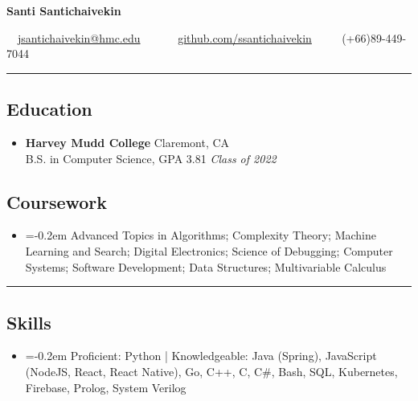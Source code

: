 \documentclass[10pt,letterpaper]{article}
\begin{document}
\fontsize{9.0}{11.0}\selectfont

\begin{center}
{\Large \textbf{Santi Santichaivekin}}

\ \ \href{mailto:jsantichaivekin@hmc.edu}{jsantichaivekin@hmc.edu}\ \ 
\ \ \textbullet
\ \ \href{https://github.com/ssantichaivekin}{github.com/ssantichaivekin}
\ \ \textbullet
\ \ (+66)89-449-7044

\end{center}


\hrule
\vspace{-0.95em}
\subsection*{Education}
  \begin{itemize}
    \parskip=-0.5em

    \item[]
    \textbf{Harvey Mudd College} \hfill
      Claremont, CA\\
    {B.S. in Computer Science, GPA 3.81
    \hfill \emph{Class of 2022}}
  \end{itemize}
  \vspace{-2.2em}
\subsection*{Coursework}
\begin{itemize}
\item[]
    \parskip=-0.2em
  Advanced Topics in Algorithms; 
  Complexity Theory;
  Machine Learning and Search; 
  Digital Electronics; 
  Science of Debugging;
  Computer Systems;
  Software Development;
  Data Structures;
  Multivariable Calculus

\end{itemize}

\hrule
\vspace{-0.95em}
\subsection*{Skills}
\begin{itemize}
\item[]
    \parskip=-0.2em
  Proficient: Python |
  Knowledgeable: 
  Java (Spring),
  JavaScript (NodeJS, React, React Native),
  Go,
  C++,
  C,
  C\#,
  Bash,
  SQL,
  Kubernetes,
  Firebase,
  Prolog,
  System Verilog
    
\end{itemize}
\end{document}

